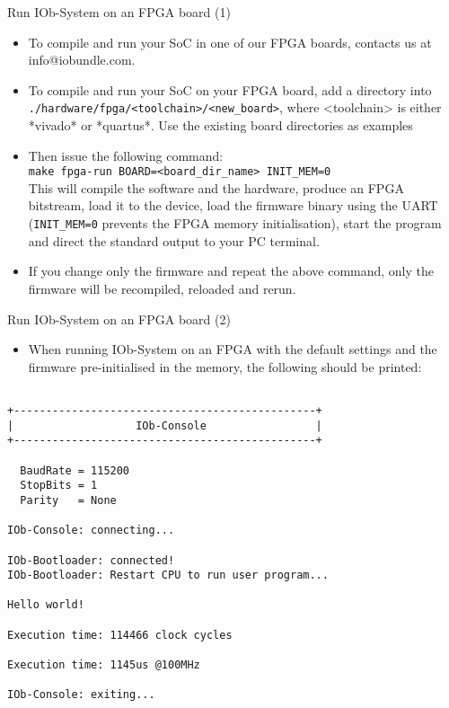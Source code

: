 \documentclass [xcolor=svgnames, t] {beamer}
\begin{document}
\begin{frame}{Run IOb-System on an FPGA board (1)}
\begin{itemize}
\item To compile and run your SoC in one of our FPGA boards, contacts us at info@iobundle.com.
\item To compile and run your SoC on your FPGA board, add a directory into {\tt ./hardware/fpga/<toolchain>/<new\_board>}, where <toolchain> is either *vivado* or *quartus*. Use the existing board directories as examples
\item Then issue the following command:\\
  {\tt make fpga-run BOARD=<board\_dir\_name> INIT\_MEM=0}\\
  This will compile the software and the hardware, produce an FPGA bitstream,
  load it to the device, load the firmware binary using the UART ({\tt INIT\_MEM=0} prevents the FPGA memory initialisation), start the
  program and direct the standard output to your PC terminal.
\item If you change only the firmware and repeat the above command, only the
  firmware will be recompiled, reloaded and rerun.
\end{itemize}
\end{frame}


\begin{frame}[fragile]{Run IOb-System on an FPGA board (2)}
\begin{itemize}
\item When running IOb-System on an FPGA with the default settings and the firmware
  pre-initialised in the memory, the following should be printed:
\end{itemize}

\begin{tiny}
  \begin{lstlisting}

+-----------------------------------------------+
|                   IOb-Console                 |
+-----------------------------------------------+

  BaudRate = 115200
  StopBits = 1
  Parity   = None

IOb-Console: connecting...

IOb-Bootloader: connected!
IOb-Bootloader: Restart CPU to run user program...

Hello world!

Execution time: 114466 clock cycles

Execution time: 1145us @100MHz

IOb-Console: exiting...

  \end{lstlisting}
\end{tiny}
\end{frame}
\end{document}
